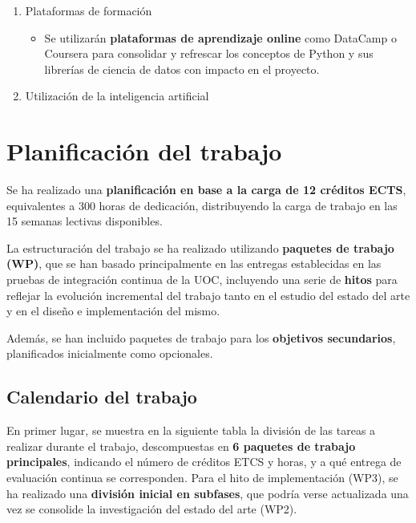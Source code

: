 \begin{enumerate}
\begin{itemize}
            \item \textbf{Repositorio de código:} GitHub como repositorio de código fuente y control de versiones.
            \item \textbf{Seguimiento ágil del proyecto:} se utilizará GitHub Projects/Trello para controlar el seguimiento del trabajo, utilizando épicas e historias de usuario.
        \end{itemize}
    \item Plataformas de formación
        \begin{itemize}
            \item Se utilizarán \textbf{plataformas de aprendizaje online} como DataCamp o Coursera para consolidar y refrescar los conceptos de Python y sus librerías de ciencia de datos con impacto en el proyecto.
        \end{itemize}    
    \item Utilización de la inteligencia artificial  
\end{enumerate}


\section{Planificación del trabajo}

Se ha realizado una \textbf{planificación en base a la carga de 12 créditos ECTS}, equivalentes a 300 horas de dedicación, distribuyendo la carga de trabajo en las 15 semanas lectivas disponibles.

La estructuración del trabajo se ha realizado utilizando \textbf{paquetes de trabajo (WP)}, que se han basado principalmente en las entregas establecidas en las pruebas de integración continua de la UOC, incluyendo una serie de \textbf{hitos} para reflejar la evolución incremental del trabajo tanto en el estudio del estado del arte y en el diseño e implementación del mismo.

Además, se han incluido paquetes de trabajo para los \textbf{objetivos secundarios}, planificados inicialmente como opcionales.

\subsection{Calendario del trabajo}

En primer lugar, se muestra en la siguiente tabla la división de las tareas a realizar durante el trabajo, descompuestas en \textbf{6 paquetes de trabajo principales}, indicando el número de créditos ETCS y horas, y a qué entrega de evaluación continua se corresponden. Para el hito de implementación (WP3), se ha realizado una \textbf{división inicial en subfases}, que podría verse actualizada una vez se consolide la investigación del estado del arte (WP2).

